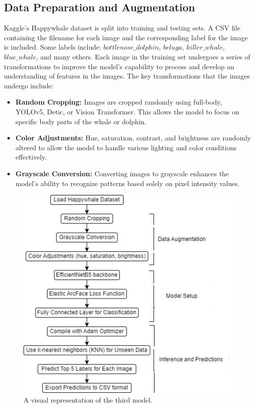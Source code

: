 \documentclass[twocolumn]{article}
\begin{document}
\subsection{Data Preparation and Augmentation}

Kaggle’s Happywhale dataset is split into training and testing sets. A CSV file containing the filename for each image and the corresponding label for the image is included. Some labels include: \(bottlenose\_dolphin\), \(beluga\), \(killer\_whale\), \(blue\_whale\), and many others. Each image in the training set undergoes a series of transformations to improve the model’s capability to process and develop an understanding of features in the images. The key transformations that the images undergo include:

\begin{itemize}
    \item \textbf{Random Cropping:} Images are cropped randomly using full-body, YOLOv5, Detic, or Vision Transformer. This allows the model to focus on specific body parts of the whale or dolphin.
    \item \textbf{Color Adjustments:} Hue, saturation, contrast, and brightness are randomly altered to allow the model to handle various lighting and color conditions effectively.
    \item \textbf{Grayscale Conversion:} Converting images to grayscale enhances the model’s ability to recognize patterns based solely on pixel intensity values. 
\end{itemize}

\begin{figure}
    \centering
    \includegraphics[width=0.7\linewidth]{model3.jpg}
    \caption{A visual representation of the third model.}
\end{figure}
\end{document}
